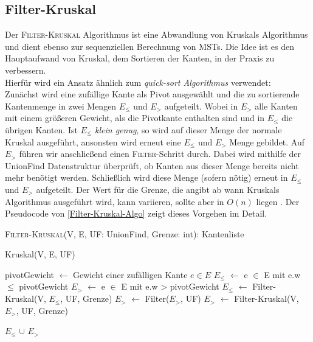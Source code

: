 \newpage


\subsection{Filter-Kruskal}
Der \textsc{Filter-Kruskal} Algorithmus \cite{osipov2009filter} ist eine Abwandlung von Kruskals Algorithmus und dient ebenso zur sequenziellen Berechnung von MSTs. Die Idee ist es den Hauptaufwand von Kruskal, dem Sortieren der Kanten, in der Praxis zu verbessern.\\
Hierfür wird ein Ansatz ähnlich zum \emph{quick-sort Algorithmus} \cite{hoare1962quicksort} verwendet: \\
Zunächst wird eine zufällige Kante als Pivot ausgewählt und die zu sortierende Kantenmenge in zwei Mengen $E_{\leq}$ und $E_>$ aufgeteilt. Wobei in $E_>$ alle Kanten mit einem größeren Gewicht, als die Pivotkante enthalten sind und in $E_{\leq}$ die übrigen Kanten.
Ist $E_{\leq}$ \emph{klein genug}, so wird auf dieser Menge der normale Kruskal ausgeführt, ansonsten wird erneut eine $E_{\leq}$ und $E_>$ Menge gebildet. Auf $E_>$ führen wir anschließend einen \textsc{Filter}-Schritt durch. Dabei wird mithilfe der UnionFind Datenstruktur überprüft, ob Kanten aus dieser Menge bereits nicht mehr benötigt werden. Schließlich wird diese Menge (sofern nötig) erneut in $E_{\leq}$ und $E_>$ aufgeteilt. Der Wert für die Grenze, die angibt ab wann Kruskals Algorithmus ausgeführt wird, kann variieren, sollte aber in $O(n)$ liegen \cite{osipov2009filter}.
Der Pseudocode von \cref{Filter-Kruskal-Algo} zeigt dieses Vorgehen im Detail.\\

\begin{algorithm} 
\caption{\textsc{Filter-Kruskal}(V, E, UF: UnionFind, Grenze: int): Kantenliste}
\begin{algorithmic}[1]
\label{Filter-Kruskal-Algo}

    \RETURN Kruskal(V, E, UF)
\ENDIF

\STATE pivotGewicht $\gets$ Gewicht einer zufälligen Kante $e \in E$
\STATE $E_{\leq}$ $\gets$ e $\in$ E mit e.w $\leq$ pivotGewicht
\STATE $E_>$ $\gets$ e $\in$ E mit e.w > pivotGewicht
\STATE $E_{\leq}$ $\gets$ Filter-Kruskal(V, $E_{\leq}$, UF, Grenze)
\STATE $E_>$ $\gets$ Filter($E_>$, UF)
\STATE $E_>$ $\gets$ Filter-Kruskal(V, $E_>$, UF, Grenze)

\RETURN  $E_{\leq}$ $\cup$ $E_>$


\end{algorithmic}
\end{algorithm}


